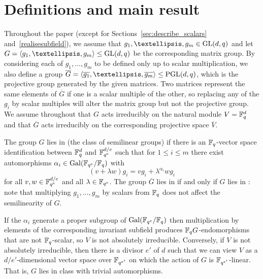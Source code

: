 \section{Definitions and main result}\label{sec:defns}

Throughout the paper (except for Sections~\ref{sec:describe_scalars} and~\ref{realisesubfield}), 
we assume that 
$g_1, \ldots, g_m \in \GL(d,q)$ 
and let $G = \left< g_1, \ldots,
g_m\right> \le \GL(d,q)$ be the corresponding matrix 
group. By considering each of $g_1, \ldots, g_m$ to be 
defined only up to scalar multiplication, we also 
define a group $\overline G = 
\left< \overline{g_1}, \ldots, \overline{g_m} \right> \leq
\PGL(d,q)$, which is the projective group generated by 
the given matrices. Two matrices represent the same elements of $\overline{G}$ 
if one is a scalar multiple of the other, 
so replacing any of the $g_i$ by scalar multiples will 
alter the matrix group but not the projective group.
We assume throughout that $G$ acts irreducibly on the natural
module $V = \mathbb{F}_q^d$ and that $\overline{G}$ acts irreducibly
on the corresponding projective space $\overline{V}$.


\begin{Def} \label{def:semilin}
The group $G$ lies in  (the class of semilinear groups) 
if there is an $\mathbb{F}_q$-vector space identification between
$\mathbb{F}_q^d$ and $\mathbb{F}_{q^e}^{d/e}$ such that
for $1 \le i \le m$ 
there exist automorphisms $\alpha_i \in \Gal(\F_{q^e}/\F_q)$ 
with \[(v+\lambda
w)g_i = v  g_i + \lambda^{\alpha_i}  w  g_i\] for
all $v,w \in \mathbb{F}_{q^e}^{d/e}$ and all $\lambda \in \mathbb{F}_{q^e}$.
 The 
group $\overline{G}$ lies in  if and only if $G$ lies in : 
note that multiplying $g_1, \ldots, g_m$ by scalars from $\mathbb{F}_q$ 
does not affect the semilinearity of $G$. 
\end{Def}

If the $\alpha_i$ generate a proper subgroup
of $\Gal(\F_{q^e}/\F_q)$ then
multiplication by elements of the corresponding invariant 
subfield produces $\mathbb{F}_qG$-endomorphisms that are not $\mathbb{F}_q$-scalar, so $V$ 
is not absolutely irreducible.
Conversely, if $V$ is not absolutely irreducible, then
there is a divisor $e'$ of $d$ 
such that we can view $V$ as a $d/e'$-dimensional vector space
over $\mathbb{F}_{q^{e'}}$ on which the action of $G$
is $\mathbb{F}_{q^{e'}}$-linear. That is, $G$ lies in class  with
trivial automorphisms.

